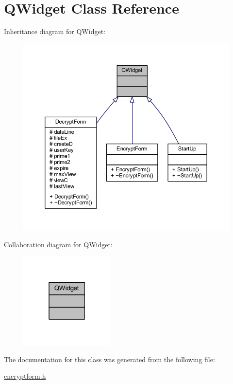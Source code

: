 \hypertarget{class_q_widget}{}\section{Q\+Widget Class Reference}
\label{class_q_widget}


Inheritance diagram for Q\+Widget\+:\nopagebreak
\begin{figure}[H]
\begin{center}
\leavevmode
\includegraphics[width=350pt]{class_q_widget__inherit__graph}
\end{center}
\end{figure}


Collaboration diagram for Q\+Widget\+:\nopagebreak
\begin{figure}[H]
\begin{center}
\leavevmode
\includegraphics[width=135pt]{class_q_widget__coll__graph}
\end{center}
\end{figure}


The documentation for this class was generated from the following file\+:\begin{DoxyCompactItemize}
\item 
\hyperlink{encryptform_8h}{encryptform.\+h}\end{DoxyCompactItemize}

